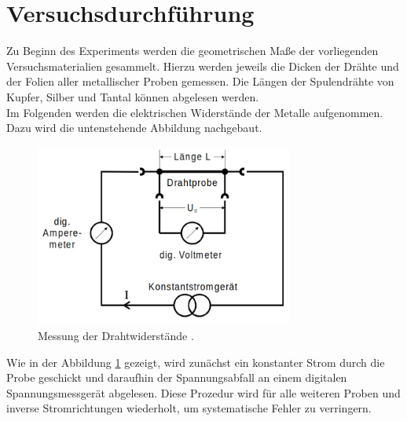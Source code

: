 




\section{Versuchsdurchführung}
\label{sec:Versuchsdurchfuehrung}

Zu Beginn des Experiments werden die geometrischen Maße der vorliegenden Versuchsmaterialien gesammelt. Hierzu 
werden jeweils die Dicken der Drähte und der Folien aller metallischer Proben gemessen. Die Längen der Spulendrähte
von Kupfer, Silber und Tantal können abgelesen werden.\\

\noindent Im Folgenden werden die elektrischen Widerstände der Metalle aufgenommen. Dazu wird die untenstehende Abbildung 
nachgebaut.

\begin{figure}
    \centering
    \includegraphics[height=6cm]{Widerstand.png}
    \caption{Messung der Drahtwiderstände \cite{Versuchsanleitung_v511}.}
    \label{fig:Widerstand}
\end{figure}

\noindent Wie in der Abbildung \ref{fig:Widerstand} gezeigt, wird zunächst ein konstanter Strom durch die Probe geschickt
und daraufhin der Spannungsabfall an einem digitalen Spannungsmessgerät abgelesen. Diese Prozedur wird für alle weiteren Proben und 
inverse Stromrichtungen wiederholt, um systematische Fehler zu verringern.\\

